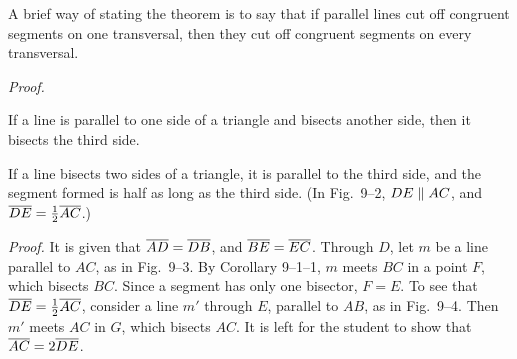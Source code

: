 \documentclass[11pt]{book}
\begin{document}
\begin{remark}
A brief way of stating the theorem is to say that if parallel lines cut off
congruent segments on one transversal, then they cut off congruent segments on
every transversal.
\end{remark}

\noindent\emph{Proof.}
\begin{steps}
\end{steps}

\FIGIXONE

\FIGIXTWOTHREE

\begin{corollary}
If a line is parallel to one side of a triangle and bisects another side, then it
bisects the third side.
\end{corollary}

\begin{corollary}
If a line bisects two sides of a triangle, it is parallel to the third side, and
the segment formed is half as long as the third side. (In Fig.~9--2,
$DE \mathrel{\|} AC$, and $\overline{DE} = \frac{1}{2}\overline{AC}$.)
\end{corollary}

\noindent\emph{Proof.} It is given that $\overline{AD} = \overline{DB}$, and
$\overline{BE} = \overline{EC}$. Through $D$, let $m$ be a line parallel to $AC$, as in
Fig.~9--3. By Corollary 9--1--1, $m$ meets $BC$ in a point $F$, which bisects
$BC$. Since a segment has only one bisector, $F = E$. To see that
$\overline{DE} = \frac{1}{2}\overline{AC}$, consider a line $m'$ through $E$, parallel to
$AB$, as in Fig.~9--4. Then $m'$ meets $AC$ in $G$, which bisects $AC$. It is
left for the student to show that $\overline{AC} = 2\overline{DE}$.

\FIGIXFOUR
\end{document}
